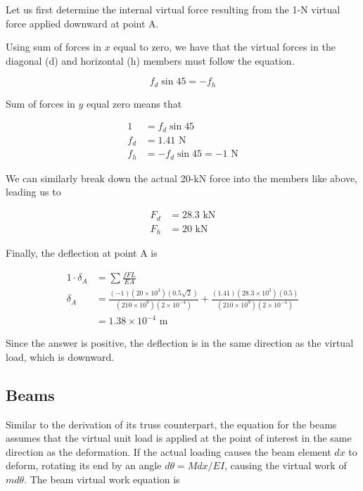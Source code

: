 \documentclass[
10pt,
a4paper,
openany,
svgnames,
]{kaobook} %
\begin{document}
\begin{solution}
  Let us first determine the internal virtual force resulting from the 1-N virtual force applied downward at point A.
  
  Using sum of forces in $x$ equal to zero, we have that the virtual forces in the diagonal (d) and horizontal (h) members must follow the equation.
  
  \begin{equation*}
    f_d \sin 45 = -f_h
  \end{equation*}
  
  Sum of forces in $y$ equal zero means that
  
  \begin{align*}
    1 &= f_d \sin 45 \\
    f_d &= 1.41 \text{ N} \\
    f_h &= -f_d \sin 45 = -1 \text{ N}
  \end{align*}

  We can similarly break down the actual 20-kN force into the members like above, leading us to
  
  \begin{align*}
    F_d &= 28.3 \text{ kN} \\
    F_h &= 20 \text{ kN}
  \end{align*}

  Finally, the deflection at point A is

  \begin{align*}
    1 \cdot \delta_A &= \sum \frac{fFL}{EA} \\
    \delta_A &= \frac{(-1)(20 \times 10^3)(0.5\sqrt{2})}{(210 \times 10^9)(2 \times 10^{-4})} + \frac{(1.41)(28.3 \times 10^3)(0.5)}{(210 \times 10^9)(2 \times 10^{-4})} \\
                     &= 1.38 \times 10^{-4} \text{ m}
  \end{align*}

  Since the answer is positive, the deflection is in the same direction as the virtual load, which is downward.
  
\end{solution}

\subsection{Beams}

Similar to the derivation of its truss counterpart, the equation for the beams assumes that the virtual unit load is applied at the point of interest in the same direction as the deformation. If the actual loading causes the beam element $dx$ to deform, rotating its end by an angle $d\theta = M dx / EI$, causing the virtual work of $m d\theta$. The beam virtual work equation is
\end{document}
